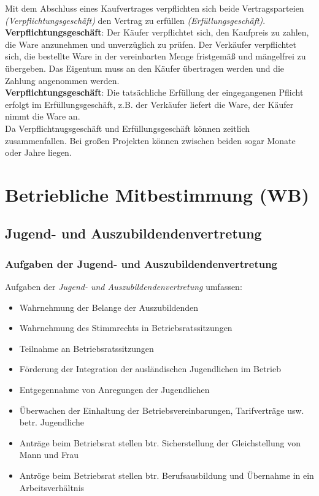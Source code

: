 \documentclass[a4paper, 12pt]{report}
\begin{document}
\begin{multicols}{2}
Mit dem Abschluss eines Kaufvertrages verpflichten sich beide Vertragsparteien
\emph{(Verpflichtungsgeschäft)} den Vertrag zu erfüllen
\emph{(Erfüllungsgeschäft)}. \\

\textbf{Verpflichtungsgeschäft}: Der Käufer verpflichtet sich, den Kaufpreis zu
zahlen, die Ware anzunehmen und unverzüglich zu prüfen. Der Verkäufer
verpflichtet sich, die bestellte Ware in der vereinbarten Menge fristgemäß und
mängelfrei zu übergeben. Das Eigentum muss an den Käufer übertragen werden und
die Zahlung angenommen werden. \\

\textbf{Verpflichtungsgeschäft}: Die tatsächliche Erfüllung der eingegangenen
Pflicht erfolgt im Erfüllungsgeschäft, z.B. der Verkäufer liefert die Ware,
der Käufer nimmt die Ware an. \\

Da Verpflichtnugsgeschäft und Erfüllungsgeschäft können zeitlich zusammenfallen.
Bei großen Projekten können zwischen beiden sogar Monate oder Jahre liegen.

\section{Betriebliche Mitbestimmung (WB)}

\subsection{Jugend- und Auszubildendenvertretung}

\subsubsection{Aufgaben der Jugend- und Auszubildendenvertretung}

Aufgaben der \emph{Jugend- und Auszubildendenvertretung} umfassen:

\begin{itemize}
    \item Wahrnehmung der Belange der Auszubildenden
    \item Wahrnehmung des Stimmrechts in Betriebsratssitzungen
    \item Teilnahme an Betriebsratssitzungen
    \item Förderung der Integration der ausländischen Jugendlichen im Betrieb
    \item Entgegennahme von Anregungen der Jugendlichen
    \item Überwachen der Einhaltung der Betriebsvereinbarungen, Tarifverträge
	usw. betr. Jugendliche
    \item Anträge beim Betriebsrat stellen btr. Sicherstellung der
	Gleichstellung von Mann und Frau
    \item Antröge beim Betriebsrat stellen btr. Berufsausbildung und Übernahme
	in ein Arbeitsverhältnis
\end{itemize}


\end{multicols}
\end{document}
